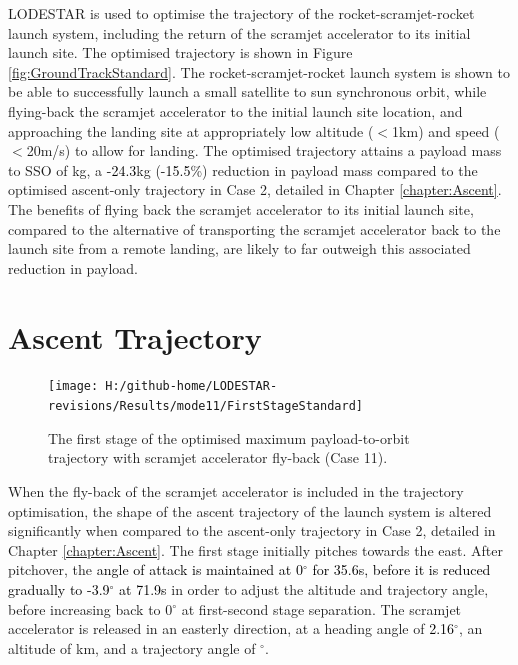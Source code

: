 LODESTAR is used to optimise the trajectory of the rocket-scramjet-rocket launch system, including the return of the scramjet accelerator to its initial launch site. The optimised trajectory is shown in Figure \ref{fig:GroundTrackStandard}. 
The rocket-scramjet-rocket launch system is shown to be able to successfully launch a small satellite to sun synchronous orbit, 
while flying-back the scramjet accelerator to the initial launch site location, and approaching the landing site at appropriately low altitude ($<$1km) and speed ($<$20m/s) to allow for landing. 
The optimised trajectory attains a payload mass to SSO of \PayloadToOrbitStandard kg, a \textcolor{black}{-24.3}kg (\textcolor{black}{-15.5}\%) reduction in payload mass compared to the optimised ascent-only trajectory in Case 2, detailed in Chapter \ref{chapter:Ascent}. 
The benefits of flying back the scramjet accelerator to its initial launch site, compared to the alternative of transporting the scramjet accelerator back to the launch site from a remote landing, are likely to far outweigh this associated reduction in payload. 



\section{Ascent Trajectory}

\begin{figure}[ht]%
	\centering
	\texttt{[image: H:/github-home/LODESTAR-revisions/Results/mode11/FirstStageStandard]}
	\caption{The first stage of the optimised maximum payload-to-orbit trajectory with scramjet accelerator fly-back (Case 11). }
	\label{fig:FirstStageStandard}
\end{figure}
When the fly-back of the scramjet accelerator is included in the trajectory optimisation, the shape of the ascent trajectory of the launch system is altered significantly when compared to the ascent-only trajectory in Case 2, detailed in Chapter \ref{chapter:Ascent}.
 The first stage initially pitches towards the east.
 After pitchover, the \textcolor{black}{angle of attack is maintained at 0$^\circ$ for 35.6s, before it is reduced gradually to -3.9$^\circ$ at 71.9s} in order to adjust the altitude and trajectory angle, before increasing back to 0$^\circ$ at first-second stage separation. 
 The scramjet accelerator is released in an easterly direction, at a heading angle of \textcolor{black}{2.16}$^\circ$, an altitude of \firstsecondSeparationAltStandard km, and a trajectory angle of \firstsecondSeparationgammaStandard $^\circ$. 
 
